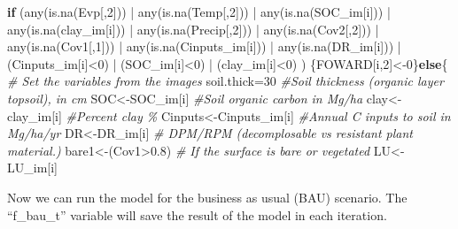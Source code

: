 \documentclass[
  10pt,
  b5paper,
]{book}
\newenvironment{Shaded}{\begin{snugshade}}{\end{snugshade}}
\newcommand{\CommentTok}[1]{\textcolor[rgb]{0.56,0.35,0.01}{\textit{#1}}}
\newcommand{\ControlFlowTok}[1]{\textcolor[rgb]{0.13,0.29,0.53}{\textbf{#1}}}
\newcommand{\DecValTok}[1]{\textcolor[rgb]{0.00,0.00,0.81}{#1}}
\newcommand{\FloatTok}[1]{\textcolor[rgb]{0.00,0.00,0.81}{#1}}
\newcommand{\FunctionTok}[1]{\textcolor[rgb]{0.00,0.00,0.00}{#1}}
\newcommand{\NormalTok}[1]{#1}
\newcommand{\OtherTok}[1]{\textcolor[rgb]{0.56,0.35,0.01}{#1}}
\newcommand{\SpecialCharTok}[1]{\textcolor[rgb]{0.00,0.00,0.00}{#1}}
\begin{document}
\begin{Shaded}
\begin{Highlighting}[]
\ControlFlowTok{if}\NormalTok{ (}\FunctionTok{any}\NormalTok{(}\FunctionTok{is.na}\NormalTok{(Evp[,}\DecValTok{2}\NormalTok{])) }\SpecialCharTok{|} \FunctionTok{any}\NormalTok{(}\FunctionTok{is.na}\NormalTok{(Temp[,}\DecValTok{2}\NormalTok{])) }\SpecialCharTok{|} \FunctionTok{any}\NormalTok{(}\FunctionTok{is.na}\NormalTok{(SOC\_im[i])) }\SpecialCharTok{|} \FunctionTok{any}\NormalTok{(}\FunctionTok{is.na}\NormalTok{(clay\_im[i])) }\SpecialCharTok{|} \FunctionTok{any}\NormalTok{(}\FunctionTok{is.na}\NormalTok{(Precip[,}\DecValTok{2}\NormalTok{]))  }\SpecialCharTok{|}  \FunctionTok{any}\NormalTok{(}\FunctionTok{is.na}\NormalTok{(Cov2[,}\DecValTok{2}\NormalTok{]))  }\SpecialCharTok{|}  \FunctionTok{any}\NormalTok{(}\FunctionTok{is.na}\NormalTok{(Cov1[,}\DecValTok{1}\NormalTok{])) }\SpecialCharTok{|} \FunctionTok{any}\NormalTok{(}\FunctionTok{is.na}\NormalTok{(Cinputs\_im[i])) }\SpecialCharTok{|} \FunctionTok{any}\NormalTok{(}\FunctionTok{is.na}\NormalTok{(DR\_im[i])) }\SpecialCharTok{|}\NormalTok{ (Cinputs\_im[i]}\SpecialCharTok{\textless{}}\DecValTok{0}\NormalTok{) }\SpecialCharTok{|}\NormalTok{  (SOC\_im[i]}\SpecialCharTok{\textless{}}\DecValTok{0}\NormalTok{) }\SpecialCharTok{|}\NormalTok{ (clay\_im[i]}\SpecialCharTok{\textless{}}\DecValTok{0}\NormalTok{) ) \{FOWARD[i,}\DecValTok{2}\NormalTok{]}\OtherTok{\textless{}{-}}\DecValTok{0}\NormalTok{\}}\ControlFlowTok{else}\NormalTok{\{}
\CommentTok{\# Set the variables from the images}
\NormalTok{soil.thick}\OtherTok{=}\DecValTok{30}  \CommentTok{\#Soil thickness (organic layer topsoil), in cm}
\NormalTok{SOC}\OtherTok{\textless{}{-}}\NormalTok{SOC\_im[i]      }\CommentTok{\#Soil organic carbon in Mg/ha }
\NormalTok{clay}\OtherTok{\textless{}{-}}\NormalTok{clay\_im[i]        }\CommentTok{\#Percent clay \%}
\NormalTok{Cinputs}\OtherTok{\textless{}{-}}\NormalTok{Cinputs\_im[i]    }\CommentTok{\#Annual C inputs to soil in Mg/ha/yr}
\NormalTok{DR}\OtherTok{\textless{}{-}}\NormalTok{DR\_im[i]              }\CommentTok{\# DPM/RPM (decomplosable vs resistant plant material.)}
\NormalTok{bare1}\OtherTok{\textless{}{-}}\NormalTok{(Cov1}\SpecialCharTok{\textgreater{}}\FloatTok{0.8}\NormalTok{)           }\CommentTok{\# If the surface is bare or vegetated}
\NormalTok{LU}\OtherTok{\textless{}{-}}\NormalTok{LU\_im[i]}
\end{Highlighting}
\end{Shaded}

Now we can run the model for the business as usual (BAU) scenario. The ``f\_bau\_t'' variable will save the result of the model in each iteration.
\end{document}
